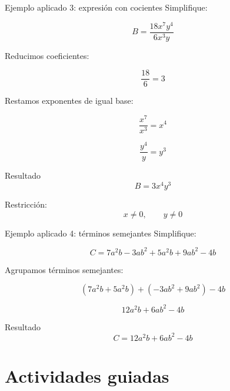 \documentclass[handout,aspectratio=169]{beamer}
\begin{document}
	\begin{frame}{Ejemplo aplicado 3: expresión con cocientes}
		Simplifique:
		
		\[
		B=\frac{18x^7y^4}{6x^3y}
		\]
		
		\pause
		
		Reducimos coeficientes:
		
		\[
		\frac{18}{6}=3
		\]
		
		\pause
		
		Restamos exponentes de igual base:
		
		\[
		\frac{x^7}{x^3}=x^4
		\]
		
		\[
		\frac{y^4}{y}=y^3
		\]
		
		\pause
		
		\begin{block}{Resultado}
			\[
			B=3x^4y^3
			\]
		\end{block}
		
		\pause
		
		\begin{alerta}
			Restricción:
			\[
			x\neq 0,\qquad y\neq 0
			\]
		\end{alerta}
	\end{frame}
	
	\begin{frame}{Ejemplo aplicado 4: términos semejantes}
		Simplifique:
		
		\[
		C=7a^2b-3ab^2+5a^2b+9ab^2-4b
		\]
		
		\pause
		
		Agrupamos términos semejantes:
		
		\[
		(7a^2b+5a^2b)+(-3ab^2+9ab^2)-4b
		\]
		
		\pause
		
		\[
		12a^2b+6ab^2-4b
		\]
		
		\pause
		
		\begin{block}{Resultado}
			\[
			C=12a^2b+6ab^2-4b
			\]
		\end{block}
	\end{frame}
	
	\section{Actividades guiadas}
	
\end{document}
